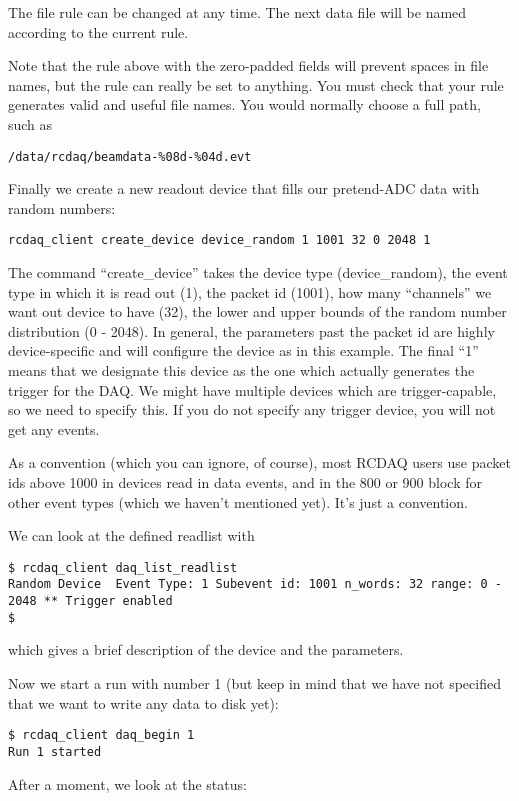 \documentclass{article}[11pt]
\begin{document}
The file rule can be changed at any time. The next data file will be
named according to the current rule.

Note that the rule above with the zero-padded fields will prevent
spaces in file names, but the rule can really be set to anything. You
must check that your rule generates valid and useful file names. You
would normally choose a full path, such as
\begin{verbatim}
/data/rcdaq/beamdata-%08d-%04d.evt 
\end{verbatim}


Finally we create a new readout device that fills our pretend-ADC data
with random numbers:
\begin{verbatim}
rcdaq_client create_device device_random 1 1001 32 0 2048 1
\end{verbatim}
The command ``create\_device'' takes the device type (device\_random),
the event type in which it is read out (1), the packet id (1001), how
many ``channels'' we want out device to have (32), the lower and upper
bounds of the random number distribution (0 - 2048). In general, the
parameters past the packet id are highly device-specific and will
configure the device as in this example.  The final ``1'' means that
we designate this device as the one which actually generates the
trigger for the DAQ. We might have multiple devices which are
trigger-capable, so we need to specify this. If you do not specify any
trigger device, you will not get any events.

As a convention (which you can ignore, of course), most RCDAQ users
use packet ids above 1000 in devices read in data events, and in the
800 or 900 block for other event types (which we haven't mentioned
yet). It's just a convention.


We can look at the defined readlist with  
\begin{verbatim}
$ rcdaq_client daq_list_readlist
Random Device  Event Type: 1 Subevent id: 1001 n_words: 32 range: 0 - 2048 ** Trigger enabled
$ 
\end{verbatim}
which gives a brief description of the device and the parameters.


Now we start a run with number 1 (but keep in mind that we have not specified that we want to write any 
data to disk yet):

\begin{verbatim}
$ rcdaq_client daq_begin 1
Run 1 started
\end{verbatim}

After a moment, we look at the status:
\end{document}
